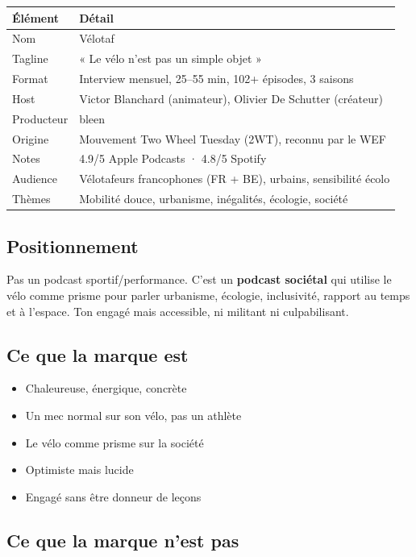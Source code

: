 \documentclass[a4paper,11pt]{article}
\newcommand{\tableheader}{\rowcolor{tableHeader}\bfseries}
\begin{document}
\begin{tcolorbox}[card]
\begin{tabularx}{\textwidth}{@{}lX@{}}
\toprule
\tableheader Élément & Détail \\
\midrule
Nom & Vélotaf \\
Tagline & « Le vélo n'est pas un simple objet » \\
Format & Interview mensuel, 25--55 min, 102+ épisodes, 3 saisons \\
Host & Victor Blanchard (animateur), Olivier De Schutter (créateur) \\
Producteur & bleen \\
Origine & Mouvement Two Wheel Tuesday (2WT), reconnu par le WEF \\
Notes & 4.9/5 Apple Podcasts · 4.8/5 Spotify \\
Audience & Vélotafeurs francophones (FR + BE), urbains, sensibilité écolo \\
Thèmes & Mobilité douce, urbanisme, inégalités, écologie, société \\
\bottomrule
\end{tabularx}
\end{tcolorbox}

\subsection{Positionnement}

Pas un podcast sportif/performance. C'est un \textbf{podcast sociétal} qui utilise le vélo comme prisme pour parler urbanisme, écologie, inclusivité, rapport au temps et à l'espace. Ton engagé mais accessible, ni militant ni culpabilisant.

\subsection{Ce que la marque est}

\begin{itemize}[nosep]
  \item Chaleureuse, énergique, concrète
  \item Un mec normal sur son vélo, pas un athlète
  \item Le vélo comme prisme sur la société
  \item Optimiste mais lucide
  \item Engagé sans être donneur de leçons
\end{itemize}

\subsection{Ce que la marque n'est pas}
\end{document}

